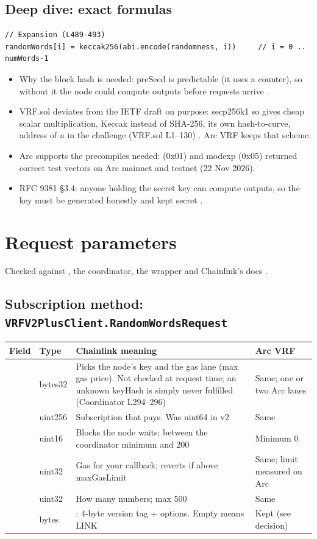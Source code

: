 \documentclass[11pt,a4paper]{article}
\newenvironment{deepdive}[1]{\subsection*{Deep dive: #1}\addcontentsline{toc}{subsection}{Deep dive: #1}}{}
\begin{document}
\begin{deepdive}{exact formulas}
\begin{lstlisting}[language=Solidity]
// Expansion (L489-493)
randomWords[i] = keccak256(abi.encode(randomness, i))     // i = 0 .. numWords-1
\end{lstlisting}
\begin{itemize}
  \item Why the block hash is needed: preSeed is predictable (it uses a counter), so without it the node could compute outputs before requests arrive \cite{cllaunch}.
  \item VRF.sol deviates from the IETF draft on purpose: secp256k1 so  gives cheap scalar multiplication, Keccak instead of SHA-256, its own hash-to-curve, address of $u$ in the challenge (VRF.sol L1--130) \cite{clvrfsol}. Arc VRF keeps that scheme.
  \item Arc supports the precompiles needed:  (0x01) and modexp (0x05) returned correct test vectors on Arc mainnet and testnet (22 Nov 2026).
  \item RFC 9381 \S3.4: anyone holding the secret key can compute outputs, so the key must be generated honestly and kept secret \cite{rfc9381}.
\end{itemize}
\end{deepdive}

\section{Request parameters}
Checked against , the coordinator, the wrapper and Chainlink's docs \cite{clclient,clmigv2,clgetsub,clgetdf}.

\subsection{Subscription method: \texorpdfstring{\texttt{VRFV2PlusClient.RandomWordsRequest}}{VRFV2PlusClient.RandomWordsRequest}}
{\small
\begin{tabularx}{\textwidth}{P{2.9cm}P{1.3cm}LP{2.4cm}}
\toprule
Field & Type & Chainlink meaning & Arc VRF\\
\midrule
{} & bytes32 & Picks the node's key and the gas lane (max gas price). Not checked at request time; an unknown keyHash is simply never fulfilled (Coordinator L294--296) & Same; one or two Arc lanes\\
 & uint256 & Subscription that pays. Was uint64 in v2 \cite{clmigv2} & Same\\
 & uint16 & Blocks the node waits; between the coordinator minimum and 200 & Minimum 0\\
 & uint32 & Gas for your callback; reverts if above maxGasLimit & Same; limit measured on Arc\\
 & uint32 & How many numbers; max 500 & Same\\
 & bytes & : 4-byte version tag + options. Empty means LINK & Kept (see decision)\\
\bottomrule
\end{tabularx}}
\end{document}

